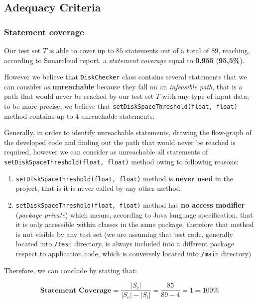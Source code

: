 \documentclass[conference, onecolumn]{IEEEtran}
\newcommand{\abs}[1]{\left|#1\right|}
\begin{document}
\subsection{Adequacy Criteria}

\subsubsection{Statement coverage}

Our test set $T$ is able to cover up to $85$ statements out of a total of $89$, reaching, according to Sonarcloud report, a \textit{statement coverage} equal to \textbf{0,955} (\textbf{95,5\%}).

However we believe that \texttt{DiskChecker} class contains several statements that we can consider as \textbf{unreachable} because they fall on an \textit{infeasible path}, that is a path that would never be reached by our test set $T$ with any type of input data; to be more precise, we believe that  \texttt{setDiskSpaceThreshold(float, float)} method contains up to $4$ unreachable statements. 

Generally, in order to identify unreachable statements, drawing the flow-graph of the developed code and finding out the path that would never be reached is required, however we can consider as unreachable all statements of \texttt{setDiskSpaceThreshold(float, float)} method owing to following reasons:

\begin{enumerate}
\item \texttt{setDiskSpaceThreshold(float, float)} method is \textbf{never used} in the project, that is it is never called by any other method.
\item \texttt{setDiskSpaceThreshold(float, float)} method has \textbf{no access modifier} (\textit{package private}) which means, according to Java language specification, that it is only accessible within classes in the same package, therefore that method is not visible by any test set (we are assuming that test code, generally located into \texttt{/test} directory, is always included into a different package respect to application code, which is conversely located into \texttt{/main} directory)
\end{enumerate}

Therefore, we can conclude by stating that:

\begin{equation} 
\textbf{Statement Coverage} = \dfrac{\abs{S_c}}{\abs{S_e} - \abs{S_i}} = \dfrac{85}{89-4} = 1 = 100\%
\end{equation}
\end{document}
